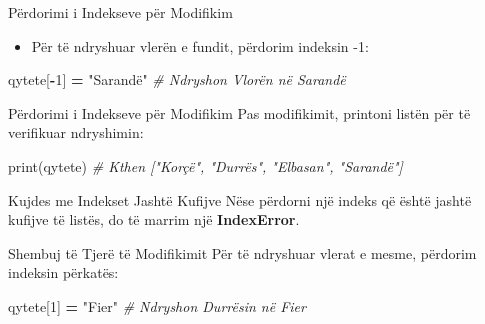 \documentclass[
  ignorenonframetext,
]{beamer}
\newenvironment{Shaded}{\begin{snugshade}}{\end{snugshade}}
\newcommand{\BuiltInTok}[1]{#1}
\newcommand{\CommentTok}[1]{\textcolor[rgb]{0.56,0.35,0.01}{\textit{#1}}}
\newcommand{\DecValTok}[1]{\textcolor[rgb]{0.00,0.00,0.81}{#1}}
\newcommand{\NormalTok}[1]{#1}
\newcommand{\OperatorTok}[1]{\textcolor[rgb]{0.81,0.36,0.00}{\textbf{#1}}}
\newcommand{\StringTok}[1]{\textcolor[rgb]{0.31,0.60,0.02}{#1}}
\providecommand{\tightlist}{%
  \setlength{\itemsep}{0pt}\setlength{\parskip}{0pt}}
\begin{document}
\begin{frame}[fragile]{Përdorimi i Indekseve për Modifikim}
\protect\hypertarget{puxebrdorimi-i-indekseve-puxebr-modifikim-1}{}
\begin{itemize}
\tightlist
\item
  Për të ndryshuar vlerën e fundit, përdorim indeksin -1:
\end{itemize}

\begin{Shaded}
\begin{Highlighting}[]
\NormalTok{qytete[}\OperatorTok{{-}}\DecValTok{1}\NormalTok{] }\OperatorTok{=} \StringTok{"Sarandë"}  \CommentTok{\# Ndryshon Vlorën në Sarandë}
\end{Highlighting}
\end{Shaded}
\end{frame}

\begin{frame}[fragile]{Përdorimi i Indekseve për Modifikim}
\protect\hypertarget{puxebrdorimi-i-indekseve-puxebr-modifikim-2}{}
Pas modifikimit, printoni listën për të verifikuar ndryshimin:

\begin{Shaded}
\begin{Highlighting}[]
\BuiltInTok{print}\NormalTok{(qytete)  }\CommentTok{\# Kthen ["Korçë", "Durrës", "Elbasan", "Sarandë"]}
\end{Highlighting}
\end{Shaded}
\end{frame}

\begin{frame}{Kujdes me Indekset Jashtë Kufijve}
\protect\hypertarget{kujdes-me-indekset-jashtuxeb-kufijve-2}{}
Nëse përdorni një indeks që është jashtë kufijve të listës, do të marrim
një \textbf{IndexError}.
\end{frame}

\begin{frame}[fragile]{Shembuj të Tjerë të Modifikimit}
\protect\hypertarget{shembuj-tuxeb-tjeruxeb-tuxeb-modifikimit}{}
Për të ndryshuar vlerat e mesme, përdorim indeksin përkatës:

\begin{Shaded}
\begin{Highlighting}[]
\NormalTok{qytete[}\DecValTok{1}\NormalTok{] }\OperatorTok{=} \StringTok{"Fier"}  \CommentTok{\# Ndryshon Durrësin në Fier}
\end{Highlighting}
\end{Shaded}
\end{frame}
\end{document}
